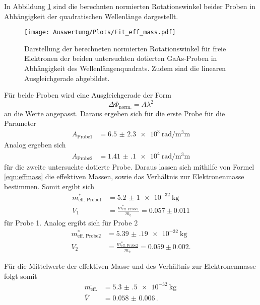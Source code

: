 In Abbildung \ref{fig:beideProben} sind die berechnten normierten Rotationswinkel beider Proben in
Abhängigkeit der quadratischen Wellenlänge dargestellt.
\begin{figure}[H]
  \centering
  \texttt{[image: Auswertung/Plots/Fit\_eff\_mass.pdf]}
  \caption{Darstellung der berechneten normierten Rotationswinkel für freie Elektronen der beiden untersuchten
  dotierten GaAs-Proben in Abhängigkeit des Wellenlängenquadrats. Zudem sind die linearen
  Ausgleichgerade abgebildet.}
  \label{fig:beideProben}
\end{figure} \noindent
Für beide Proben wird eine Ausgleichgerade der
Form
\begin{equation*}
  \Delta \Phi_\text{norm.} = A \lambda^2
\end{equation*} \noindent
an die Werte angepasst. Daraus ergeben sich für die erste Probe für die Parameter
\begin{align}
  A_\text{Probe1} &= \SI{6.5(23)e3}{\radian\per\cubic\milli\meter}
\end{align} \noindent
Analog ergeben sich
\begin{align}
  A_\text{Probe2} &= \SI{1.41(10)e4}{\radian\per\cubic\milli\meter}
\end{align} \noindent
für die zweite untersuchte dotierte Probe. Daraus lassen sich mithilfe von Formel \ref{eqn:effmass}
die effektiven Massen, sowie das Verhältnis zur Elektronenmasse bestimmen. Somit ergibt sich
\begin{align}
  m_\text{eff. Probe1}^* &= \SI{5.2(10)e-32}{\kilo\gram} \\
  V_1 &= \frac{m_\text{eff. Probe1}^*}{m_\text{e}} = 0.057 \pm 0.011
\end{align}
für Probe 1. Analog ergibt sich für Probe 2
\begin{align}
  m_\text{eff. Probe2}^* &= \SI{5.39(19)e-32}{\kilo\gram} \\
  V_2 &= \frac{m_\text{eff. Probe2}^*}{m_\text{e}} = 0.059 \pm 0.002.
\end{align} \noindent

Für die Mittelwerte der effektiven Masse und des Verhältnis zur Elektronenmasse folgt somit
\begin{align}
  \overline{m_\text{eff.}} &= \SI{5.3(5)e-32}{\kilo\gram} \, \\
  \overline{V} &= \num{0.058(6)} \, .
\end{align}
